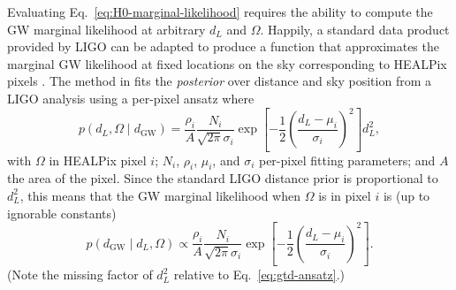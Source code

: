 \documentclass[modern]{aastex62}
\newcommand{\dGW}{d_{\mathrm{GW}}}
\begin{document}
Evaluating Eq.\ \eqref{eq:H0-marginal-likelihood} requires the ability to
compute the \ac{GW} marginal likelihood at arbitrary $d_L$ and $\Omega$.
Happily, a standard data product provided by LIGO \citep{Singer2016} can be
adapted to produce a function that approximates the marginal \ac{GW} likelihood
at fixed locations on the sky corresponding to HEALPix pixels
\citep{Gorski2005}.  The method in \citet{Singer2016} fits the \emph{posterior}
over distance and sky position from a LIGO analysis using a per-pixel ansatz
where
%
\begin{equation}
    \label{eq:gtd-ansatz}
    p\left( d_L, \Omega \mid \dGW \right) = \frac{\rho_i}{A} \frac{N_i}{\sqrt{2\pi} \sigma_i} \exp\left[ -\frac{1}{2} \left(\frac{d_L-\mu_i}{\sigma_i}\right)^2 \right] d_L^2,
\end{equation}
%
with $\Omega$ in HEALPix pixel $i$; $N_i$, $\rho_i$, $\mu_i$, and $\sigma_i$
per-pixel fitting parameters; and $A$ the area of the pixel.  Since the standard
LIGO distance prior is proportional to $d_L^2$, this means that the \ac{GW}
marginal likelihood when $\Omega$ is in pixel $i$ is (up to ignorable constants)
%
\begin{equation}
    p\left( \dGW \mid d_L, \Omega \right) \propto \frac{\rho_i}{A} \frac{N_i}{\sqrt{2\pi} \sigma_i} \exp\left[ -\frac{1}{2} \left(\frac{d_L-\mu_i}{\sigma_i}\right)^2 \right].
\end{equation}
%
(Note the missing factor of $d_L^2$ relative to Eq.\ \eqref{eq:gtd-ansatz}.)
\end{document}
